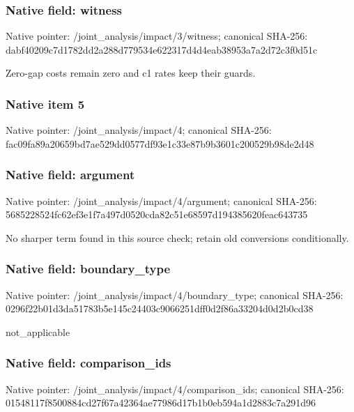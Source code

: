 \documentclass[10pt,a4paper]{article}
\begin{document}
\subsubsection{Native field: witness}
Native pointer: /joint\_\allowbreak{}analysis/impact/3/witness; canonical SHA-256: dabf40209c7d1782dd2a288d779534e622317d4d4eab38953a7a2d72c3f0d51c

\begingroup\raggedright\sloppy Zero-gap costs remain zero and c1 rates keep their guards.\par\endgroup

\subsubsection{Native item 5}
Native pointer: /joint\_\allowbreak{}analysis/impact/4; canonical SHA-256: fac09fa89a20659bd7ae529dd0577df93e1c33e87b9b3601c200529b98de2d48

\subsubsection{Native field: argument}
Native pointer: /joint\_\allowbreak{}analysis/impact/4/argument; canonical SHA-256: 5685228524fc62ef3e1f7a497d0520cda82c51e68597d194385620feac643735

\begingroup\raggedright\sloppy No sharper term found in this source check;\allowbreak{} retain old conversions conditionally.\par\endgroup

\subsubsection{Native field: boundary\_\allowbreak{}type}
Native pointer: /joint\_\allowbreak{}analysis/impact/4/boundary\_\allowbreak{}type; canonical SHA-256: 0296f22b01d3da51783b5e145c24403c9066251dff0d2f86a33204d0d2b0cd38

\begingroup\raggedright\sloppy not\_\allowbreak{}applicable\par\endgroup

\subsubsection{Native field: comparison\_\allowbreak{}ids}
Native pointer: /joint\_\allowbreak{}analysis/impact/4/comparison\_\allowbreak{}ids; canonical SHA-256: 01548117f8500884cd27f67a42364ae77986d17b1b0eb594a1d2883c7a291d96
\end{document}
